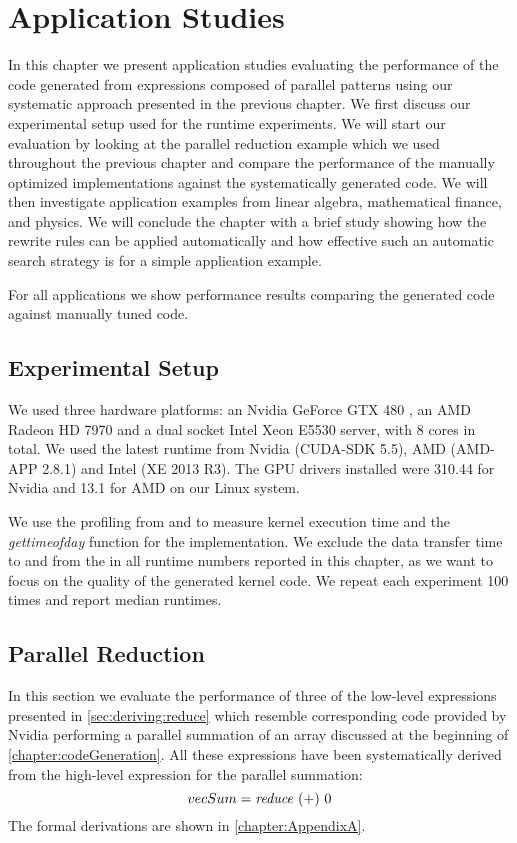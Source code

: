 
\chapter{Application Studies}
\label{ch:sixth} %
\label{chapter:codeGeneration-evaluation}

In this chapter we present application studies evaluating the performance of the \OpenCL code generated from expressions composed of parallel patterns using our systematic approach presented in the previous chapter.
We first discuss our experimental setup used for the runtime experiments.
We will start our evaluation by looking at the parallel reduction example which we used throughout the previous chapter and compare the performance of the manually optimized \OpenCL implementations against the systematically generated code.
We will then investigate application examples from linear algebra, mathematical finance, and physics.
We will conclude the chapter with a brief study showing how the rewrite rules can be applied automatically and how effective such an automatic search strategy is for a simple application example.

For all applications we show performance results comparing the generated \OpenCL code against manually tuned \OpenCL code.

\section{Experimental Setup}
We used three hardware platforms: an Nvidia GeForce GTX 480 \GPU, an AMD Radeon HD 7970 \GPU and a dual socket Intel Xeon E5530 server, with 8 cores in total.
We used the latest \OpenCL runtime from Nvidia (CUDA-SDK 5.5), AMD (AMD-APP 2.8.1) and Intel (XE 2013 R3).
The GPU drivers installed were 310.44 for Nvidia and 13.1 for AMD on our Linux system.

We use the profiling \APIs from \OpenCL and \CUDA to measure kernel execution time and the \textit{gettimeofday} function for the \CPU implementation.
We exclude the data transfer time to and from the \GPU in all runtime numbers reported in this chapter, as we want to focus on the quality of the generated \OpenCL kernel code.
We repeat each experiment 100 times and report median runtimes.




\section{Parallel Reduction}
In this section we evaluate the performance of three of the low-level expressions presented in \autoref{sec:deriving:reduce} which resemble corresponding \OpenCL code provided by Nvidia performing a parallel summation of an array discussed at the beginning of \autoref{chapter:codeGeneration}.
All these expressions have been systematically derived from the high-level expression for the parallel summation:
\begin{equation*}
  vecSum = \text{\textit{reduce}}\ (+)\ 0
\end{equation*}
The formal derivations are shown in \autoref{chapter:AppendixA}.

